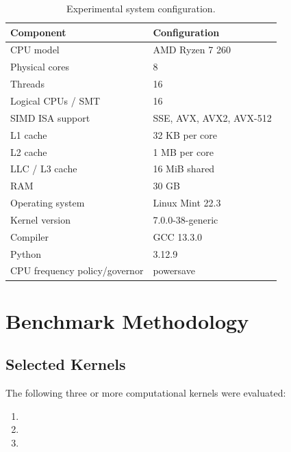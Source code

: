 \documentclass[11pt]{article}
\begin{document}
\begin{table}[H]
    \centering
    \caption{Experimental system configuration.}
    \label{tab:system}
    \begin{tabular}{ll}
        \toprule
        \textbf{Component} & \textbf{Configuration} \\
        \midrule
        CPU model & AMD Ryzen 7 260 \\
        Physical cores & 8 \\
        Threads & 16 \\
        Logical CPUs / SMT & 16 \\
        SIMD ISA support & SSE, AVX, AVX2, AVX-512 \\
        L1 cache & 32 KB per core \\
        L2 cache & 1 MB per core \\
        LLC / L3 cache & 16 MiB shared \\
        RAM & 30 GB \\
        Operating system & Linux Mint 22.3 \\
        Kernel version & 7.0.0-38-generic \\
        Compiler & GCC 13.3.0 \\
        Python & 3.12.9 \\
        CPU frequency policy/governor & powersave \\
        \bottomrule
    \end{tabular}
\end{table}


\section{Benchmark Methodology}

\subsection{Selected Kernels}

The following three or more computational kernels were evaluated:

\begin{enumerate}
    \item [Kernel 1]
    \item [Kernel 2]
    \item [Kernel 3]
\end{enumerate}
\end{document}

